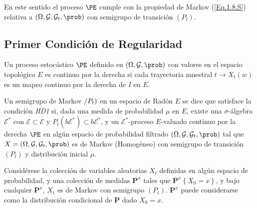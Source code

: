 En este sentido el proceso $\PE$ cumple con la propiedad de Markov
(\ref{Eq.1.8.S}) relativa a
$\left(\Omega,\mathcal{G},\mathcal{G}_{t},\prob\right)$ con
semigrupo de transici\'on $\left(P_{t}\right)$.

\subsection{Primer Condici\'on de Regularidad}


\begin{Def}
Un proceso estoc\'astico $\PE$ definido en
$\left(\Omega,\mathcal{G},\prob\right)$ con valores en el espacio
topol\'ogico $E$ es continuo por la derecha si cada trayectoria
muestral $t\rightarrow X_{t}\left(w\right)$ es un mapeo continuo
por la derecha de $I$ en $E$.
\end{Def}

\begin{Def}[HD1]\label{Eq.2.1.S}
Un semigrupo de Markov $\left/P_{t}\right)$ en un espacio de
Rad\'on $E$ se dice que satisface la condici\'on {\em HD1} si,
dada una medida de probabilidad $\mu$ en $E$, existe una
$\sigma$-\'algebra $\mathcal{E^{*}}$ con
$\mathcal{E}\subset\mathcal{E}$ y
$P_{t}\left(b\mathcal{E}^{*}\right)\subset b\mathcal{E}^{*}$, y un
$\mathcal{E}^{*}$-proceso $E$-valuado continuo por la derecha
$\PE$ en alg\'un espacio de probabilidad filtrado
$\left(\Omega,\mathcal{G},\mathcal{G}_{t},\prob\right)$ tal que
$X=\left(\Omega,\mathcal{G},\mathcal{G}_{t},\prob\right)$ es de
Markov (Homog\'eneo) con semigrupo de transici\'on $(P_{t})$ y
distribuci\'on inicial $\mu$.
\end{Def}
Consid\'erese la colecci\'on de variables aleatorias $X_{t}$
definidas en alg\'un espacio de probabilidad, y una colecci\'on de
medidas $\mathbf{P}^{x}$ tales que
$\mathbf{P}^{x}\left\{X_{0}=x\right\}$, y bajo cualquier
$\mathbf{P}^{x}$, $X_{t}$ es de Markov con semigrupo
$\left(P_{t}\right)$. $\mathbf{P}^{x}$ puede considerarse como la
distribuci\'on condicional de $\mathbf{P}$ dado $X_{0}=x$.

